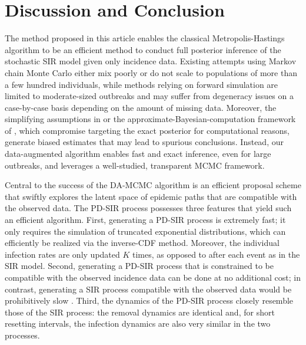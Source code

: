 \documentclass[11pt]{article}
\begin{document}
	\section{Discussion and Conclusion}
	\label{sec:dis}
	The method proposed in this article enables the classical Metropolis-Hastings algorithm to be an efficient method to conduct full posterior inference of the stochastic SIR model given only incidence data. Existing attempts using Markov chain Monte Carlo either mix poorly or do not scale to populations of more than a few hundred individuals, while methods relying on forward simulation are limited to moderate-sized outbreaks and may suffer from degeneracy issues on a case-by-case basis depending on the amount of missing data. 	Moreover, the simplifying assumptions in \cite{Fintzi.2020} or the approximate-Bayesian-computation framework of \cite{McKinley.2018}, which compromise targeting the exact posterior for computational reasons, generate biased estimates that may lead to spurious conclusions. Instead, our data-augmented algorithm enables fast and exact inference, even for large outbreaks, and leverages a well-studied, transparent MCMC framework. %
			
	Central to the success of the DA-MCMC algorithm is an efficient proposal scheme that swiftly explores the latent space of epidemic paths that are compatible with the observed data. The PD-SIR process possesses three features that yield such an efficient algorithm. First, generating a PD-SIR process is extremely fast; it only requires the simulation of truncated exponential distributions, which can efficiently be realized via the inverse-CDF method. Moreover, the individual infection rates are only updated $K$ times, as opposed to after each event as in the SIR model. Second, generating a PD-SIR process that is constrained to be compatible with the observed incidence data can be done at no additional cost; in contrast, generating a SIR process compatible with the observed data would be prohibitively slow \cite{Hobolth.2009}. Third, the dynamics of the PD-SIR process closely resemble those of the SIR process: the removal dynamics are identical and, for short resetting intervals, the infection dynamics are also very similar in the two processes.
	
\end{document}
